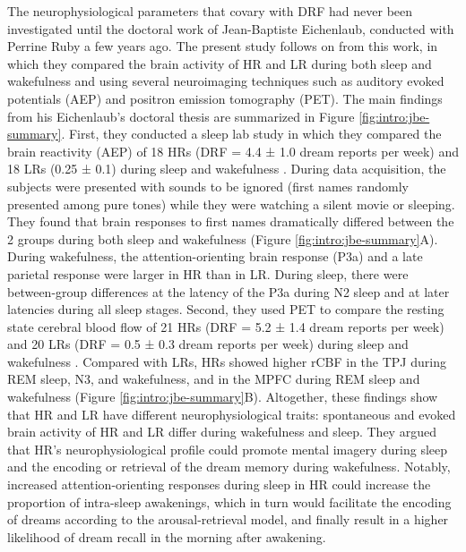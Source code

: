 The neurophysiological parameters that covary with DRF had never been investigated until the doctoral work of Jean-Baptiste Eichenlaub, conducted with Perrine Ruby a few years ago. The present study follows on from this work, in which they compared the brain activity of HR and LR during both sleep and wakefulness and using several neuroimaging techniques such as auditory evoked potentials (AEP) and positron emission tomography (PET). The main findings from his Eichenlaub’s doctoral thesis are summarized in Figure \ref{fig:intro:jbe-summary}.
First, they conducted a sleep lab study in which they compared the brain reactivity (AEP) of 18 HRs (DRF = 4.4 ± 1.0 dream reports per week) and 18 LRs (0.25 ± 0.1) during sleep and wakefulness \citep{eichenlaub_brain_2014}. During data acquisition, the subjects were presented with sounds to be ignored (first names randomly presented among pure tones) while they were watching a silent movie or sleeping. They found that brain responses to first names dramatically differed between the 2 groups during both sleep and wakefulness (Figure \ref{fig:intro:jbe-summary}A). During wakefulness, the attention-orienting brain response (P3a) and a late parietal response were larger in HR than in LR. During sleep, there were between-group differences at the latency of the P3a during N2 sleep and at later latencies during all sleep stages.
Second, they used PET to compare the resting state cerebral blood flow of 21 HRs (DRF = 5.2 ± 1.4 dream reports per week) and 20 LRs (DRF = 0.5 ± 0.3 dream reports per week) during sleep and wakefulness \citep{eichenlaub_resting_2014}. Compared with LRs, HRs showed higher rCBF in the TPJ during REM sleep, N3, and wakefulness, and in the MPFC during REM sleep and wakefulness (Figure \ref{fig:intro:jbe-summary}B).
Altogether, these findings show that HR and LR have different neurophysiological traits: spontaneous and evoked brain activity of HR and LR differ during wakefulness and sleep. They argued that HR’s neurophysiological profile could promote mental imagery during sleep and the encoding or retrieval of the dream memory during wakefulness. Notably, increased attention-orienting responses during sleep in HR could increase the proportion of intra-sleep awakenings, which in turn would facilitate the encoding of dreams according to the arousal-retrieval model, and finally result in a higher likelihood of dream recall in the morning after awakening.


